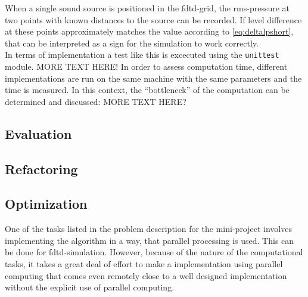 When a single sound source is positioned in the \gls{fdtd}-grid, the \gls{rms}-pressure at two points with known distances to the source can be recorded. If level difference at these points approximately matches the value according to \autoref{eq:deltalpshort}, that can be interpreted as a sign for the simulation to work correctly.\\
In terms of implementation a test like this is excecuted using the \texttt{unittest} module.
MORE TEXT HERE!
In order to assess computation time, different implementations are run on the same machine with the same parameters and the time is measured. In this context, the ``bottleneck'' of the computation can be determined and discussed: MORE TEXT HERE?
\subsection{Evaluation}\label{ssec:evaluation}
\subsection{Refactoring}\label{ssec:refactoring}
\subsection{Optimization}\label{ssec:optimization}
One of the tasks listed in the problem description for the mini-project involves implementing the algorithm in a way, that parallel processing is used. This can be done for \gls{fdtd}-simulation. However, because of the nature of the computational tasks, it takes a great deal of effort to make a implementation using parallel computing that comes even remotely close to a well designed implementation without the explicit use of parallel computing.